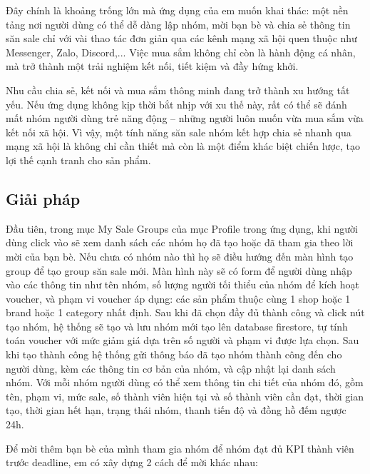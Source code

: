 \documentclass[../DoAn.tex]{subfiles}
\begin{document}
Đây chính là khoảng trống lớn mà ứng dụng của em muốn khai thác: một nền tảng nơi người dùng có thể dễ dàng lập nhóm, mời bạn bè và chia sẻ thông tin săn sale chỉ với vài thao tác đơn giản qua các kênh mạng xã hội quen thuộc như Messenger, Zalo, Discord,... Việc mua sắm không chỉ còn là hành động cá nhân, mà trở thành một trải nghiệm kết nối, tiết kiệm và đầy hứng khởi.

Nhu cầu chia sẻ, kết nối và mua sắm thông minh đang trở thành xu hướng tất yếu. Nếu ứng dụng không kịp thời bắt nhịp với xu thế này, rất có thể sẽ đánh mất nhóm người dùng trẻ năng động – những người luôn muốn vừa mua sắm vừa kết nối xã hội. Vì vậy, một tính năng săn sale nhóm kết hợp chia sẻ nhanh qua mạng xã hội là không chỉ cần thiết mà còn là một điểm khác biệt chiến lược, tạo lợi thế cạnh tranh cho sản phẩm.

\subsection{Giải pháp}
Đầu tiên, trong mục My Sale Groups của mục Profile trong ứng dụng, khi người dùng click vào sẽ xem danh sách các nhóm họ đã tạo hoặc đã tham gia theo lời mời của bạn bè. Nếu chưa có nhóm nào thì họ sẽ điều hướng đến màn hình tạo group để tạo group săn sale mới. Màn hình này sẽ có form để người dùng nhập vào các thông tin như tên nhóm, số lượng người tối thiểu của nhóm để kích hoạt voucher, và phạm vi voucher áp dụng: các sản phẩm thuộc cùng 1 shop hoặc 1 brand hoặc 1 category nhất định. Sau khi đã chọn đầy đủ thành công và click nút tạo nhóm, hệ thống sẽ tạo và lưu nhóm mới tạo lên database firestore, tự tính toán voucher với mức giảm giá dựa trên số người và phạm vi được lựa chọn. Sau khi tạo thành công hệ thống gửi thông báo đã tạo nhóm thành công đến cho người dùng, kèm các thông tin cơ bản của nhóm, và cập nhật lại danh sách nhóm. Với mỗi nhóm người dùng có thể xem thông tin chi tiết của nhóm đó, gồm tên, phạm vi, mức sale, số thành viên hiện tại và số thành viên cần đạt, thời gian tạo, thời gian hết hạn, trạng thái nhóm, thanh tiến độ và đồng hồ đếm ngược 24h. 

Để mời thêm bạn bè của mình tham gia nhóm để nhóm đạt đủ KPI thành viên trước deadline, em có xây dựng 2 cách để mời khác nhau:
\end{document}
